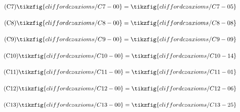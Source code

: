 \begin{figure}[ht]
{\begin{minipage}{.975\textwidth}
\begin{center}
\begin{subfigure}{0.32\textwidth}
        \end{subfigure}
        \begin{subfigure}{0.32\textwidth}
            \begin{align}\label{C7}\tag{C7}\tikzfig{cliffordczaxioms/C7-00}=\tikzfig{cliffordczaxioms/C7-05}\end{align}
        \end{subfigure}\vspace{-0.5em}
        \begin{subfigure}{0.61\textwidth}
            \begin{align}\label{C8}\tag{C8}\tikzfig{cliffordczaxioms/C8-00}=\tikzfig{cliffordczaxioms/C8-08}\end{align}
        \end{subfigure}\vspace{-0.5em}
        \begin{subfigure}{0.61\textwidth}
            \begin{align}\label{C9}\tag{C9}\tikzfig{cliffordczaxioms/C9-00}=\tikzfig{cliffordczaxioms/C9-09}\end{align}
        \end{subfigure}\vspace{-0.5em}
        \begin{subfigure}{0.61\textwidth}
            \begin{align}\label{C10}\tag{C10}\tikzfig{cliffordczaxioms/C10-00}=\tikzfig{cliffordczaxioms/C10-14}\end{align}
        \end{subfigure}\vspace{-0.5em}
        \begin{subfigure}{0.61\textwidth}
            \begin{align}\label{C11}\tag{C11}\tikzfig{cliffordczaxioms/C11-00}=\tikzfig{cliffordczaxioms/C11-01}\end{align}
        \end{subfigure}
        \begin{subfigure}{0.35\textwidth}
            \begin{align}\label{C12}\tag{C12}\tikzfig{cliffordczaxioms/C12-00}=\tikzfig{cliffordczaxioms/C12-06}\end{align}
        \end{subfigure}
        \begin{subfigure}{.85\textwidth}
            \begin{align}\label{C13}\tag{C13}\tikzfig{cliffordczaxioms/C13-00}=\tikzfig{cliffordczaxioms/C13-25}\end{align}

\end{subfigure}
\end{center}
\end{minipage}}
\end{figure}
